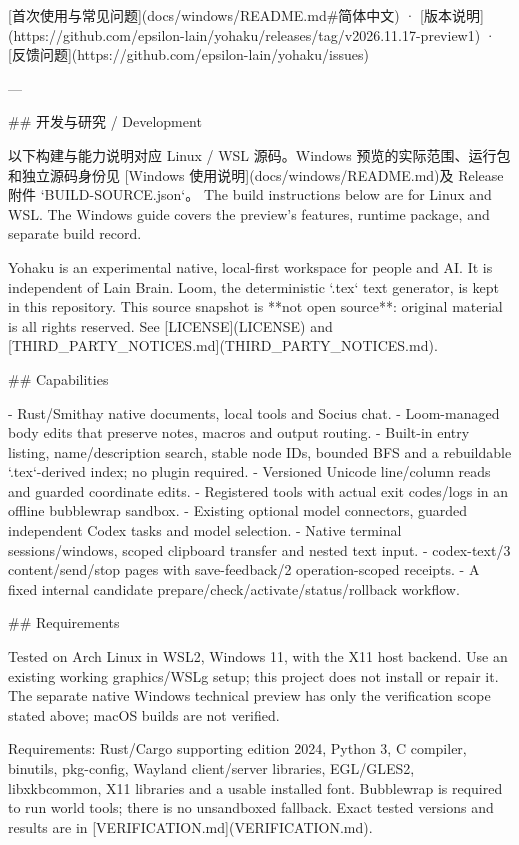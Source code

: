 [首次使用与常见问题](docs/windows/README.md#简体中文) · [版本说明](https://github.com/epsilon-lain/yohaku/releases/tag/v2026.11.17-preview1) · [反馈问题](https://github.com/epsilon-lain/yohaku/issues)

---

## 开发与研究 / Development

以下构建与能力说明对应 Linux / WSL 源码。Windows 预览的实际范围、运行包和独立源码身份见
[Windows 使用说明](docs/windows/README.md)及 Release 附件 `BUILD-SOURCE.json`。
The build instructions below are for Linux and WSL. The Windows guide covers the preview’s features, runtime package, and separate build record.

Yohaku is an experimental native, local-first workspace for people and AI.
It is independent of Lain Brain. Loom, the deterministic `.tex` text generator,
is kept in this repository. This source snapshot is **not open source**:
original material is all rights reserved. See [LICENSE](LICENSE) and
[THIRD_PARTY_NOTICES.md](THIRD_PARTY_NOTICES.md).

## Capabilities

- Rust/Smithay native documents, local tools and Socius chat.
- Loom-managed body edits that preserve notes, macros and output routing.
- Built-in entry listing, name/description search, stable node IDs, bounded BFS
  and a rebuildable `.tex`-derived index; no plugin required.
- Versioned Unicode line/column reads and guarded coordinate edits.
- Registered tools with actual exit codes/logs in an offline bubblewrap sandbox.
- Existing optional model connectors, guarded independent Codex tasks and model selection.
- Native terminal sessions/windows, scoped clipboard transfer and nested text input.
- codex-text/3 content/send/stop pages with save-feedback/2 operation-scoped receipts.
- A fixed internal candidate prepare/check/activate/status/rollback workflow.

## Requirements

Tested on Arch Linux in WSL2, Windows 11, with the X11 host backend. Use an
existing working graphics/WSLg setup; this project does not install or repair it.
The separate native Windows technical preview has only the verification scope stated above; macOS builds are not verified.

Requirements: Rust/Cargo supporting edition 2024, Python 3, C compiler, binutils,
pkg-config, Wayland client/server libraries, EGL/GLES2, libxkbcommon, X11
libraries and a usable installed font. Bubblewrap is required to run world
tools; there is no unsandboxed fallback. Exact tested versions and results are
in [VERIFICATION.md](VERIFICATION.md).

